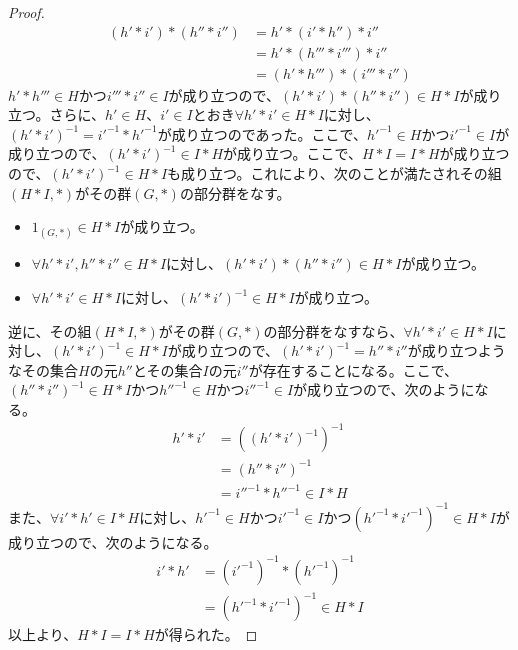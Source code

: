 \documentclass[dvipdfmx]{jsarticle}
\begin{document}
\begin{dfn}
\begin{proof}
\begin{align*}
\left( h'*i' \right)*\left( h''*i'' \right) &= h'*\left( i'*h'' \right)*i''\\
&= h'*\left( h'''*i''' \right)*i''\\
&= \left( h'*h''' \right)*\left( i'''*i'' \right)
\end{align*}
$h'*h''' \in H$かつ$i'''*i'' \in I$が成り立つので、$\left( h'*i' \right)*\left( h''*i'' \right) \in H*I$が成り立つ。さらに、$h' \in H$、$i' \in I$とおき$\forall h'*i' \in H*I$に対し、$\left( h'*i' \right)^{- 1} = {i'}^{- 1}*{h'}^{- 1}$が成り立つのであった。ここで、${h'}^{- 1} \in H$かつ${i'}^{- 1} \in I$が成り立つので、$\left( h'*i' \right)^{- 1} \in I*H$が成り立つ。ここで、$H*I = I*H$が成り立つので、$\left( h'*i' \right)^{- 1} \in H*I$も成り立つ。これにより、次のことが満たされその組$(H*I,*)$がその群$(G,*)$の部分群をなす。
\begin{itemize}
\item
  $1_{(G,*)} \in H*I$が成り立つ。
\item
  $\forall h'*i',h''*i'' \in H*I$に対し、$\left( h'*i' \right)*\left( h''*i'' \right) \in H*I$が成り立つ。
\item
  $\forall h'*i' \in H*I$に対し、$\left( h'*i' \right)^{- 1} \in H*I$が成り立つ。
\end{itemize}\par
逆に、その組$(H*I,*)$がその群$(G,*)$の部分群をなすなら、$\forall h'*i' \in H*I$に対し、$\left( h'*i' \right)^{- 1} \in H*I$が成り立つので、$\left( h'*i' \right)^{- 1} = h''*i''$が成り立つようなその集合$H$の元$h''$とその集合$I$の元$i''$が存在することになる。ここで、$\left( h''*i'' \right)^{- 1} \in H*I$かつ${h''}^{- 1} \in H$かつ${i''}^{- 1} \in I$が成り立つので、次のようになる。
\begin{align*}
h'*i' &= \left( \left( h'*i' \right)^{- 1} \right)^{- 1}\\
&= \left( h''*i'' \right)^{- 1}\\
&= {i''}^{- 1}*{h''}^{- 1} \in I*H
\end{align*}
また、$\forall i'*h' \in I*H$に対し、${h'}^{- 1} \in H$かつ${i'}^{- 1} \in I$かつ$\left( {h'}^{- 1}*{i'}^{- 1} \right)^{- 1} \in H*I$が成り立つので、次のようになる。
\begin{align*}
i'*h' &= \left( {i'}^{- 1} \right)^{- 1}*\left( {h'}^{- 1} \right)^{- 1}\\
&= \left( {h'}^{- 1}*{i'}^{- 1} \right)^{- 1} \in H*I
\end{align*}
以上より、$H*I = I*H$が得られた。
\end{proof}

\end{dfn}
\end{document}
